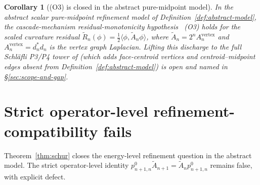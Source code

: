 \documentclass[11pt]{article}
\theoremstyle{plain}
\newtheorem{corollary}[theorem]{Corollary}
\theoremstyle{definition}
\theoremstyle{remark}
\begin{document}
\begin{corollary}[(O3) is closed in the abstract pure-midpoint model]\label{cor:O3-closed}
In the abstract scalar pure-midpoint refinement model of
Definition~\ref{def:abstract-model}, the cascade-mechanism
residual-monotonicity hypothesis \cite{CascadeMechanism}~(O3) holds
for the scaled curvature residual
$\widetilde R_n(\phi) = \tfrac12 \langle \phi, \widetilde A_n \phi\rangle$,
where $\widetilde A_n = 2^n A_n^{\mathrm{vertex}}$ and
$A_n^{\mathrm{vertex}} = d_n^{*} d_n$ is the vertex
graph Laplacian. Lifting this discharge to the full Schl\"{a}fli
P3/P4 tower of
\cite{CascadeRefinementSpaces, CascadeClosureDynamics} (which adds
face-centroid vertices and centroid--midpoint edges absent from
Definition~\ref{def:abstract-model}) is open and named in
\S\ref{sec:scope-and-gap}.
\end{corollary}

\section{Strict operator-level refinement-compatibility fails}\label{sec:strict-fails}

Theorem~\ref{thm:schur} closes the energy-level refinement question
in the abstract model.
The strict operator-level identity
$p^{0}_{n+1, n} \widetilde A_{n+1} = \widetilde A_n p^{0}_{n+1, n}$
remains false, with explicit defect.
\end{document}
